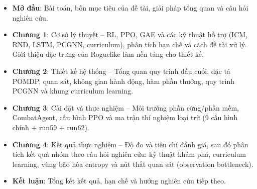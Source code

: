 \vspace{0.3cm}


\renewcommand{\labelitemi}{$-$}
\begin{itemize}
	\item \textbf{Mở đầu}: Bài toán, bốn mục tiêu của đề tài, giải pháp tổng quan và câu hỏi nghiên cứu.
	\item \textbf{Chương 1}: Cơ sở lý thuyết -- RL, PPO, GAE và các kỹ thuật hỗ trợ (ICM, RND, LSTM, PCGNN, curriculum), phân tích hạn chế và cách đề tài xử lý. Giới thiệu đặc trưng của Roguelike làm nền tảng cho thiết kế.
	\item \textbf{Chương 2}: Thiết kế hệ thống -- Tổng quan quy trình đầu cuối, đặc tả POMDP, quan sát, không gian hành động, hàm phần thưởng, quy trình PCGNN và khung curriculum learning.
	\item \textbf{Chương 3}: Cài đặt và thực nghiệm -- Môi trường phần cứng/phần mềm, CombatAgent, cấu hình PPO và ma trận thí nghiệm loại trừ (9 cấu hình chính + run59 + run62).
	\item \textbf{Chương 4}: Kết quả thực nghiệm -- Độ đo và tiêu chí đánh giá, sau đó phân tích kết quả nhóm theo câu hỏi nghiên cứu: kỹ thuật khám phá, curriculum learning, vùng bão hòa entropy và nút thắt quan sát (observation bottleneck).
	\item \textbf{Kết luận}: Tổng kết kết quả, hạn chế và hướng nghiên cứu tiếp theo.
\end{itemize}

